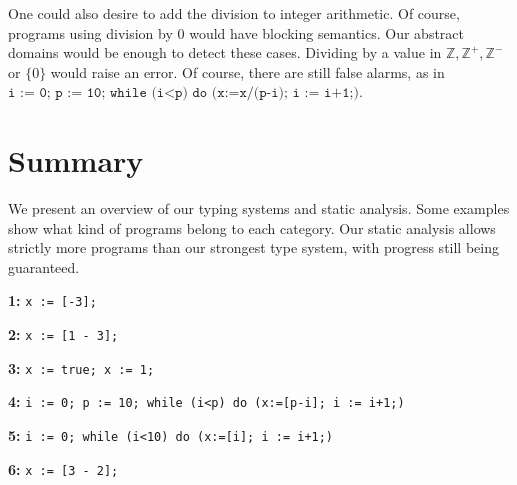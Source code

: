 One could also desire to add the division to integer arithmetic. Of course, programs using division by 0 would have blocking semantics. Our abstract domains would be enough to detect these cases. Dividing by a value in $\mathbb{Z}, \mathbb{Z^+}, \mathbb{Z^-}$ or $\lbrace 0 \rbrace$ would raise an error. Of course, there are still false alarms, as in $\texttt{i := 0; p := 10; while (i<p) do (x:=x/(p-i); i := i+1;)}$.



\section*{Summary}

We present an overview of our typing systems and static analysis. Some examples show what kind of programs belong to each category. Our static analysis allows strictly more programs than our strongest type system, with progress still being guaranteed.

  \begin{center}
  \end{center}

  
  \textbf{1:}
  \texttt{x := [-3];}

  \textbf{2:}
  \texttt{x := [1 - 3];}

  \textbf{3:}
  \texttt{x := true; x := 1;}

  \textbf{4:}
  \texttt{i := 0; p := 10; while (i<p) do (x:=[p-i]; i := i+1;)}

  \textbf{5:}
  \texttt{i := 0; while (i<10) do (x:=[i]; i := i+1;)}

  \textbf{6:}
  \texttt{x := [3 - 2];}
    

